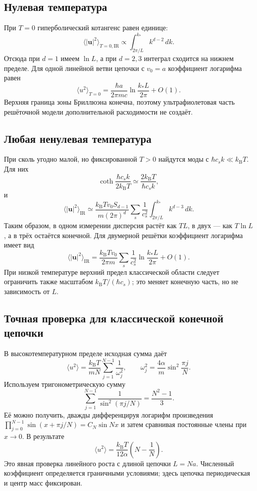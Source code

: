 \documentclass[../final.tex]{subfiles}
\begin{document}
\subsection*{Нулевая температура}

При $T=0$ гиперболический котангенс равен единице:
\[
    \langle|\boldsymbol u|^2\rangle_{T=0,\mathrm{IR}}
       \propto\int_{2\pi/L}^{k_*}k^{d-2}\,dk.
\]
Отсюда при $d=1$ имеем $\ln L$, а при $d=2,3$ интеграл
сходится на нижнем пределе. Для одной линейной ветви цепочки
с $v_0=a$ коэффициент логарифма равен
\[
    \langle u^2\rangle_{T=0}
       =\frac{\hbar a}{2\pi mc}\ln\frac{k_*L}{2\pi}+O(1).
\]
Верхняя граница зоны Бриллюэна конечна, поэтому ультрафиолетовая
часть решёточной модели дополнительной расходимости не создаёт.

\subsection*{Любая ненулевая температура}

При сколь угодно малой, но фиксированной $T>0$ найдутся моды
с $\hbar c_sk\ll k_{\mathrm B}T$. Для них
\[
    \coth\frac{\hbar c_sk}{2k_{\mathrm B}T}
       \simeq\frac{2k_{\mathrm B}T}{\hbar c_sk},
\]
и
\[
    \langle|\boldsymbol u|^2\rangle_{\mathrm{IR}}
       \simeq\frac{k_{\mathrm B}T v_0 S_{d-1}}{m(2\pi)^d}
          \sum_s\frac1{c_s^2}
          \int_{2\pi/L}^{k_*}k^{d-3}\,dk.
\]
Таким образом, в одном измерении дисперсия растёт как $TL$,
в двух --- как $T\ln L$, а в трёх остаётся конечной.
Для двумерной решётки коэффициент логарифма имеет вид
\[
    \langle|\boldsymbol u|^2\rangle_{\mathrm{IR}}
       =\frac{k_{\mathrm B}Tv_0}{2\pi m}
          \sum_s\frac1{c_s^2}\ln\frac{k_*L}{2\pi}+O(1).
\]
При низкой температуре верхний предел классической области следует
ограничить также масштабом $k_{\mathrm B}T/(\hbar c_s)$;
это меняет конечную часть, но не зависимость от $L$.

\subsection*{Точная проверка для классической конечной цепочки}

В высокотемпературном пределе исходная сумма даёт
\[
    \langle u^2\rangle
       =\frac{k_{\mathrm B}T}{mN}\sum_{j=1}^{N-1}\frac1{\omega_j^2},
    \qquad
    \omega_j^2=\frac{4\alpha}{m}\sin^2\frac{\pi j}{N}.
\]
Используем тригонометрическую сумму
\[
    \sum_{j=1}^{N-1}\frac1{\sin^2(\pi j/N)}=\frac{N^2-1}{3}.
\]
Её можно получить, дважды дифференцируя логарифм произведения
$\prod_{j=0}^{N-1}\sin(x+\pi j/N)=C_N\sin Nx$
и затем сравнивая постоянные члены при $x\to0$.
В результате
\[
    \langle u^2\rangle=\frac{k_{\mathrm B}T}{12\alpha}
       \left(N-\frac1N\right).
\]
Это явная проверка линейного роста с длиной цепочки $L=Na$.
Численный коэффициент определяется граничными условиями;
здесь цепочка периодическая и центр масс фиксирован.
\end{document}
